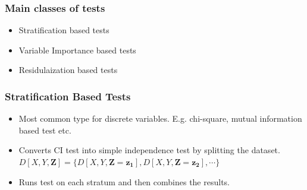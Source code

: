 \documentclass{beamer}
\begin{document}
\begin{frame}
	\frametitle{Main classes of tests}
	\begin{itemize}
		\setlength\itemsep{1em}
		\item Stratification based tests
		\item Variable Importance based tests
		\item Residulaization based tests
	\end{itemize}
\end{frame}

\begin{frame}
	\frametitle{Stratification Based Tests}
	\begin{itemize}
		\setlength\itemsep{1em}
		\item Most common type for discrete variables. E.g. chi-square,
			mutual information based test etc. 
		\item Converts CI test into simple independence test by splitting 
			the dataset.
		$ D[X, Y, \bm{Z}] = \{ D[X, Y, \bm{Z}=\bm{z_1}], D[X, Y, \bm{Z}=\bm{z_2}], \cdots \} $	
		\item Runs test on each stratum and then combines the results.
	\end{itemize}
\end{frame}
\end{document}
